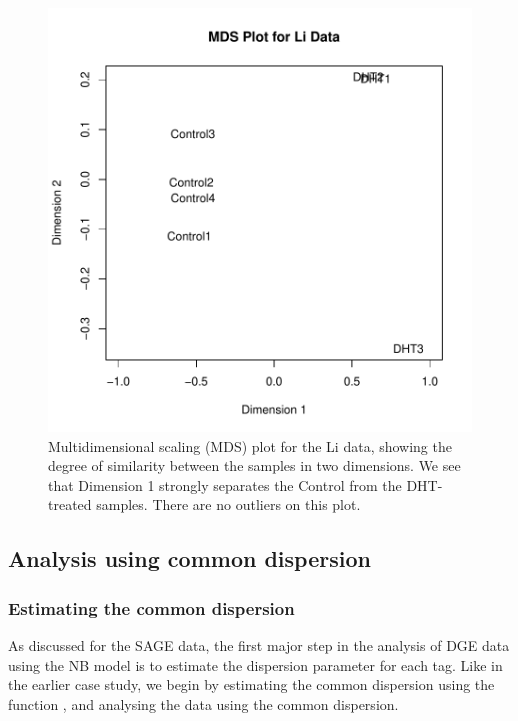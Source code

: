 \begin{figure}[ht]
\begin{center}
\includegraphics[height=0.45\textheight]{edgeR_case_study_Li_MDSplot.pdf}
\caption{Multidimensional scaling (MDS) plot for the Li data, showing
  the degree of similarity between the samples in two dimensions. We
  see that Dimension 1 strongly separates the Control from the
  DHT-treated samples. There are no outliers on this plot.}
\label{fig:Li_MDS}
\end{center}
\end{figure}


\subsection{Analysis using common dispersion}
\subsubsection{Estimating the common dispersion}
As discussed for the SAGE data, the first major step in the analysis
of DGE data using the NB model is to estimate the dispersion parameter
for each tag. Like in the earlier case study, we begin by estimating
the common dispersion using the function ,
and analysing the data using the common dispersion.

